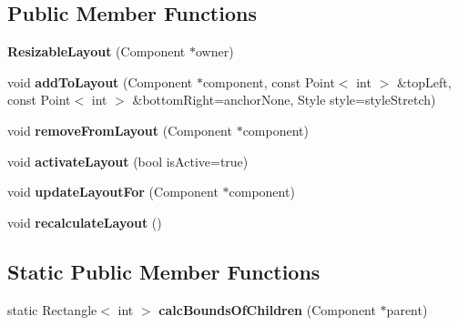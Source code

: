 \subsection*{Public Member Functions}
\begin{DoxyCompactItemize}
\item 
{\bfseries Resizable\+Layout} (Component $\ast$owner)\hypertarget{class_resizable_layout_a234ea8d8a9594d6f2625e290b9fd4bb3}{}\label{class_resizable_layout_a234ea8d8a9594d6f2625e290b9fd4bb3}

\item 
void {\bfseries add\+To\+Layout} (Component $\ast$component, const Point$<$ int $>$ \&top\+Left, const Point$<$ int $>$ \&bottom\+Right=anchor\+None, Style style=style\+Stretch)\hypertarget{class_resizable_layout_ab78c732d14d0ac2f4afd7b76f20ec6c9}{}\label{class_resizable_layout_ab78c732d14d0ac2f4afd7b76f20ec6c9}

\item 
void {\bfseries remove\+From\+Layout} (Component $\ast$component)\hypertarget{class_resizable_layout_addf2cdc690e1c6b4cea5fdf37547f84a}{}\label{class_resizable_layout_addf2cdc690e1c6b4cea5fdf37547f84a}

\item 
void {\bfseries activate\+Layout} (bool is\+Active=true)\hypertarget{class_resizable_layout_a5b5d3846e9bff81de103f0097763cedb}{}\label{class_resizable_layout_a5b5d3846e9bff81de103f0097763cedb}

\item 
void {\bfseries update\+Layout\+For} (Component $\ast$component)\hypertarget{class_resizable_layout_abaf331423c7c8994bd5945893f1e212d}{}\label{class_resizable_layout_abaf331423c7c8994bd5945893f1e212d}

\item 
void {\bfseries recalculate\+Layout} ()\hypertarget{class_resizable_layout_a14d9dad6dfc415e8d49f1e858f8abc26}{}\label{class_resizable_layout_a14d9dad6dfc415e8d49f1e858f8abc26}

\end{DoxyCompactItemize}
\subsection*{Static Public Member Functions}
\begin{DoxyCompactItemize}
\item 
static Rectangle$<$ int $>$ {\bfseries calc\+Bounds\+Of\+Children} (Component $\ast$parent)\hypertarget{class_resizable_layout_acc37523bda0ff4d250d4024c599207cc}{}\label{class_resizable_layout_acc37523bda0ff4d250d4024c599207cc}

\end{DoxyCompactItemize}
